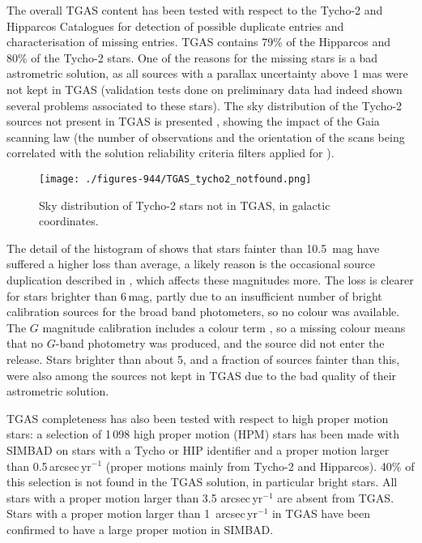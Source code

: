 The overall TGAS content has been tested with respect to the Tycho-2 \citep{2000A&A...355L..27H} and Hipparcos Catalogues \citep{1997A&A...323L..49P,1997ESASP1200.....E} 
for detection of possible duplicate entries and characterisation of missing entries. 
TGAS contains 79\% of the Hipparcos and  80\% of the Tycho-2 stars. 
One of the reasons for the missing stars is a bad astrometric 
solution, as all sources with a parallax uncertainty above 1 mas were not kept 
in TGAS (validation tests done on preliminary data had indeed shown several problems
associated to these stars).
The sky distribution of the Tycho-2 sources not present in TGAS is presented , showing the impact of the Gaia scanning law (the number of observations and the orientation of the scans being correlated with the solution reliability criteria filters applied for {}). 

\begin{figure}
    \begin{center}
        \texttt{[image: ./figures-944/TGAS\_tycho2\_notfound.png]}
        \caption[Tycho-2 stars not in TGAS]{Sky distribution of Tycho-2 stars not in TGAS, in galactic coordinates.}
        \label{fig:wp944_tgas_tycho2} 
    \end{center}
\end{figure}

The detail of the histogram of  shows that stars fainter than
10.5~mag have suffered a higher loss than average, a likely reason is the occasional 
source duplication described in , 
which affects these magnitudes more.
The loss is clearer for stars brighter than 6\,mag,
partly due to an insufficient number of bright calibration sources for the
broad band photometers, so no colour was available. 
The $G$ magnitude calibration
includes a colour term \citep{DPACP-9}, so a missing colour means that
no $G$-band photometry was produced, and the source did not enter the release.
Stars brighter than about 5, and a fraction of sources fainter than this, 
were also among the sources not kept in TGAS due to the bad quality of their 
astrometric solution.

TGAS completeness has also been tested with respect to high proper motion stars: a selection of 1\,098 high proper motion (HPM) stars has been made with SIMBAD on stars with a Tycho or HIP identifier and a proper motion larger than 0.5\,arcsec\,yr$^{-1}$ (proper motions mainly from Tycho-2 and Hipparcos). 
40\% of this selection is not found in the TGAS solution, in particular bright stars. All stars with a proper motion larger than 3.5 arcsec\,yr$^{-1}$ are absent from TGAS. 
Stars with a proper motion larger than 1~arcsec\,yr$^{-1}$ in TGAS have been confirmed to have a large proper motion in SIMBAD. 



